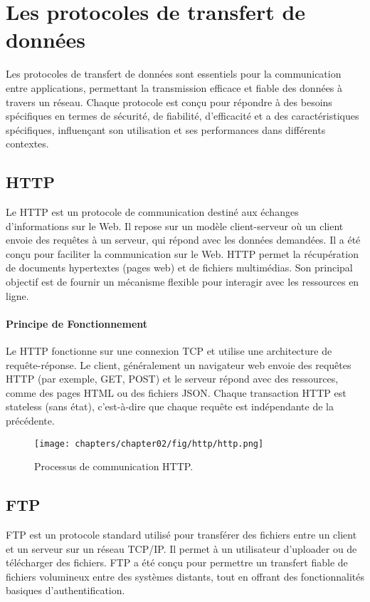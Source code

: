 \section{Les protocoles de transfert de données}
Les protocoles de transfert de données sont essentiels pour la communication entre applications, permettant la transmission efficace et fiable des données à travers un réseau. Chaque protocole est conçu pour répondre à des besoins spécifiques en termes de sécurité, de fiabilité, d'efficacité et a des caractéristiques spécifiques, influençant son utilisation et ses performances dans différents contextes.

\subsection{HTTP}

Le HTTP est un protocole de communication destiné aux échanges d’informations sur le Web. Il repose sur un modèle client-serveur où un client envoie des requêtes à un serveur, qui répond avec les données demandées. Il a été conçu pour faciliter la communication sur le Web. HTTP permet la récupération de documents hypertextes (pages web) et de fichiers multimédias. Son principal objectif est de fournir un mécanisme flexible pour interagir avec les ressources en ligne.

\paragraph{Principe de Fonctionnement}
Le HTTP fonctionne sur une connexion TCP et utilise une architecture de requête-réponse. Le client, généralement un navigateur web envoie des requêtes HTTP (par exemple, GET, POST) et le serveur répond avec des ressources, comme des pages HTML ou des fichiers JSON. Chaque transaction HTTP est stateless (sans état), c'est-à-dire que chaque requête est indépendante de la précédente.

\begin{figure}[H]
    \centering
    \texttt{[image: chapters/chapter02/fig/http/http.png]}
    \caption{Processus de communication HTTP.\cite{ionos-http-2020}}
    \label{fig:gen}
\end{figure}

\subsection{FTP}

FTP\cite{gien1978file} est un protocole standard utilisé pour transférer des fichiers entre un client et un serveur sur un réseau TCP/IP. Il permet à un utilisateur d'uploader ou de télécharger des fichiers. FTP a été conçu pour permettre un transfert fiable de fichiers volumineux entre des systèmes distants, tout en offrant des fonctionnalités basiques d'authentification.

